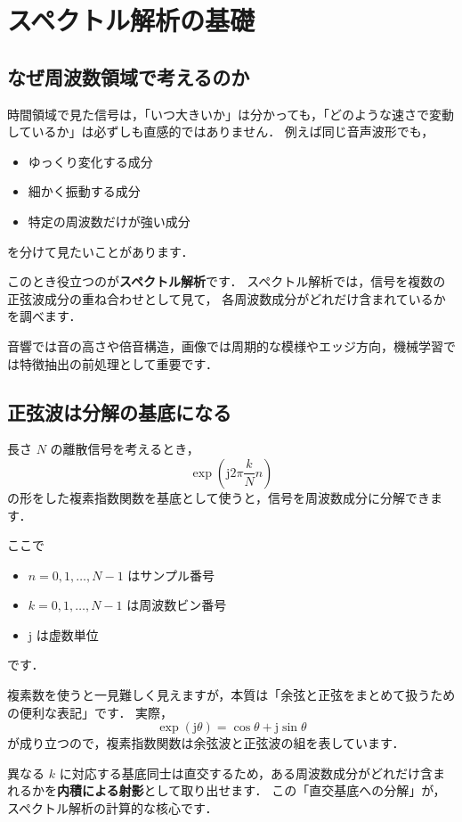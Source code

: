 \chapter{スペクトル解析の基礎}


\section{なぜ周波数領域で考えるのか}

時間領域で見た信号は，「いつ大きいか」は分かっても，「どのような速さで変動しているか」は必ずしも直感的ではありません．
例えば同じ音声波形でも，
\begin{itemize}
\item ゆっくり変化する成分
\item 細かく振動する成分
\item 特定の周波数だけが強い成分
\end{itemize}
を分けて見たいことがあります．

このとき役立つのが\textbf{スペクトル解析}です．
スペクトル解析では，信号を複数の正弦波成分の重ね合わせとして見て，
各周波数成分がどれだけ含まれているかを調べます．

音響では音の高さや倍音構造，画像では周期的な模様やエッジ方向，機械学習では特徴抽出の前処理として重要です．


\section{正弦波は分解の基底になる}

長さ $N$ の離散信号を考えるとき，
\[
\exp\left(\mathrm{j} 2\pi \frac{k}{N} n\right)
\]
の形をした複素指数関数を基底として使うと，信号を周波数成分に分解できます．

ここで
\begin{itemize}
\item $n = 0, 1, \ldots, N-1$ はサンプル番号
\item $k = 0, 1, \ldots, N-1$ は周波数ビン番号
\item $\mathrm{j}$ は虚数単位
\end{itemize}
です．

複素数を使うと一見難しく見えますが，本質は「余弦と正弦をまとめて扱うための便利な表記」です．
実際，
\[
\exp(\mathrm{j}\theta) = \cos \theta + \mathrm{j}\sin \theta
\]
が成り立つので，複素指数関数は余弦波と正弦波の組を表しています．

異なる $k$ に対応する基底同士は直交するため，ある周波数成分がどれだけ含まれるかを\textbf{内積による射影}として取り出せます．
この「直交基底への分解」が，スペクトル解析の計算的な核心です．


